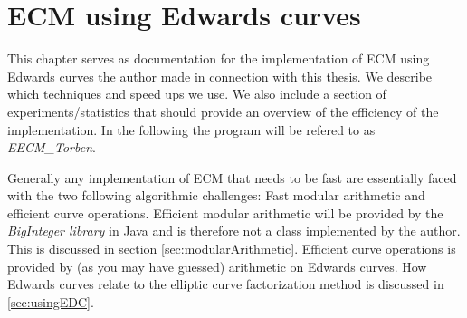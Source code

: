\chapter{ECM using Edwards curves}
\label{cha:ECMedwardsCurves}
This chapter serves as documentation for the implementation of ECM using Edwards curves the author made in connection with this thesis. We describe which techniques and speed ups we use. We also include a section of experiments/statistics that should provide an overview of the efficiency of the implementation. In the following the program will be refered to as \textit{EECM\_Torben}.

Generally any implementation of ECM that needs to be fast are essentially faced with the two following algorithmic challenges: Fast modular arithmetic and efficient curve operations. Efficient modular arithmetic will be provided by the \textit{BigInteger library} in Java and is therefore not a class implemented by the author. This is discussed in section \ref{sec:modularArithmetic}. Efficient curve operations is provided by (as you may have guessed) arithmetic on Edwards curves. How Edwards curves relate to the elliptic curve factorization method is discussed in \ref{sec:usingEDC}.


